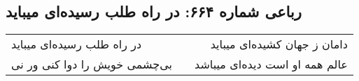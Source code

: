 \begin{center}
\section*{رباعی شماره ۶۶۴: در راه طلب رسیده‌ای میباید}
\label{sec:0664}
\begin{longtable}{l p{0.5cm} r}
در راه طلب رسیده‌ای میباید
&&
دامان ز جهان کشیده‌ای میباید
\\
بی‌چشمی خویش را دوا کنی ور نی
&&
عالم همه او است دیده‌ای میباشد
\\
\end{longtable}
\end{center}
